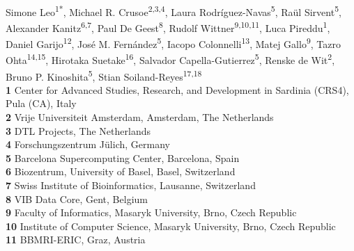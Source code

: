 \documentclass[10pt,letterpaper]{article}
\begin{document}
\vspace*{0.2in}

\begin{flushleft}
{\Large
\textbf{} %
}
\newline
\\

Simone Leo\textsuperscript{1*},
Michael R. Crusoe\textsuperscript{2,3,4},
Laura Rodríguez-Navas\textsuperscript{5}, 
Raül Sirvent\textsuperscript{5}, 
Alexander Kanitz\textsuperscript{6,7}, 
Paul De Geest\textsuperscript{8}, 
Rudolf Wittner\textsuperscript{9,10,11}, 
Luca Pireddu\textsuperscript{1}, 
Daniel Garijo\textsuperscript{12}, 
José M. Fernández\textsuperscript{5}, 
Iacopo Colonnelli\textsuperscript{13}, 
Matej Gallo\textsuperscript{9}, 
Tazro Ohta\textsuperscript{14,15}, 
Hirotaka Suetake\textsuperscript{16}, 
Salvador Capella-Gutierrez\textsuperscript{5}, 
Renske de Wit\textsuperscript{2}, 
Bruno P. Kinoshita\textsuperscript{5}, 
Stian Soiland-Reyes\textsuperscript{17,18}
\\
\bigskip
\textbf{1} Center for Advanced Studies, Research, and Development in Sardinia (CRS4), Pula (CA), Italy
\\
\textbf{2} Vrije Universiteit Amsterdam, Amsterdam, The Netherlands
\\
\textbf{3} DTL Projects, The Netherlands
\\
\textbf{4} Forschungszentrum Jülich, Germany
\\
\textbf{5} Barcelona Supercomputing Center, Barcelona, Spain
\\
\textbf{6} Biozentrum, University of Basel, Basel, Switzerland
\\
\textbf{7} Swiss Institute of Bioinformatics, Lausanne, Switzerland
\\
\textbf{8} VIB Data Core, Gent, Belgium
\\
\textbf{9} Faculty of Informatics, Masaryk University, Brno, Czech Republic
\\
\textbf{10} Institute of Computer Science, Masaryk University, Brno, Czech Republic
\\
\textbf{11} BBMRI-ERIC, Graz, Austria

\end{flushleft}
\end{document}
